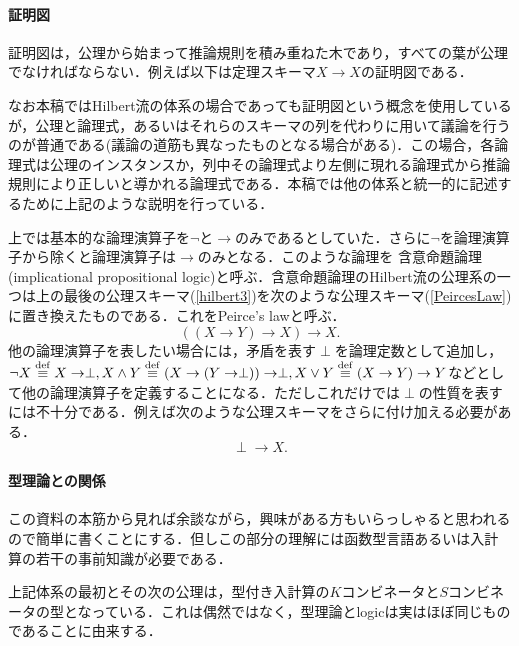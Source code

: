\documentclass{ltjsarticle}
\theoremstyle{mystyle1}
\theoremstyle{mystyle2}
\newcommand{\dequiv}{\ensuremath{\stackrel{\rm{def}}{\equiv}}}
\newcommand{\red}[1]{{\color{red} #1}}
\begin{document}
\paragraph{証明図}
証明図は，公理から始まって推論規則を積み重ねた木であり，すべての葉が公理でなければならない．例えば以下は定理スキーマ$X\to X$の証明図である．
\begin{prooftree}
\end{prooftree}
なお本稿ではHilbert流の体系の場合であっても証明図という概念を使用しているが，公理と論理式，あるいはそれらのスキーマの列を代わりに用いて議論を行うのが普通である(議論の道筋も異なったものとなる場合がある)．この場合，各論理式は公理のインスタンスか，列中その論理式より左側に現れる論理式から推論規則により正しいと導かれる論理式である．本稿では他の体系と統一的に記述するために上記のような説明を行っている．

上では基本的な論理演算子を$\neg$と$\to$のみであるとしていた．さらに$\neg$を論理演算子から除くと論理演算子は$\to$のみとなる．このような論理を\red{含意命題論理}(implicational propositional logic)と呼ぶ．含意命題論理のHilbert流の公理系の一つは上の最後の公理スキーマ(\ref{hilbert3})を次のような公理スキーマ(\ref{PeircesLaw})に置き換えたものである．これをPeirce's lawと呼ぶ．
\begin{equation}
  \left(\left(X\to Y\right)\to X\right)\to X.\label{PeircesLaw}
\end{equation}
他の論理演算子を表したい場合には，矛盾を表す$\perp$を論理定数として追加し，$\neg X\dequiv X\to\perp, X\wedge Y\dequiv\left(X\to \left(Y\to\perp\right)\right) \to\perp,X\vee Y\dequiv\left(X\to Y\right)\to Y$などとして他の論理演算子を定義することになる．ただしこれだけでは$\perp$の性質を表すには不十分である．例えば次のような公理スキーマをさらに付け加える必要がある．
\begin{equation}
  \perp\to X.\label{perpToX}
\end{equation}
\paragraph{型理論との関係}
この資料の本筋から見れば余談ながら，興味がある方もいらっしゃると思われるので簡単に書くことにする．但しこの部分の理解には函数型言語あるいは入計算の若干の事前知識が必要である．

上記体系の最初とその次の公理は，型付き入計算の$K$コンビネータと$S$コンビネータの型となっている．これは偶然ではなく，型理論とlogicは実はほぼ同じものであることに由来する．
\end{document}
